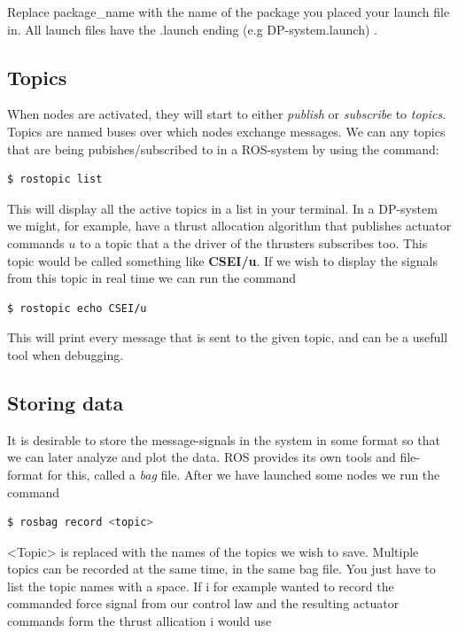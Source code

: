 \documentclass{ol-softwaremanual}
\begin{document}
Replace package\_name with the name of the package you placed your launch file in. All launch files have the .launch ending (e.g DP-system.launch) . 

\subsection{Topics}

When nodes are activated, they will start to either \textit{publish} or \textit{subscribe} to \textit{topics}. Topics are named buses over which nodes exchange messages. We can any topics that are being pubishes/subscribed to in a ROS-system by using the command: 

\begin{lstlisting}[language=bash,basicstyle=\mlttfamily, breaklines=true]
  $ rostopic list 
\end{lstlisting} 

This will display all the active topics in a list in your terminal. In a DP-system we might, for example, have a thrust allocation algorithm that publishes actuator commands $u$ to a topic that a the driver of the thrusters subscribes too. This topic would be called something like \textbf{CSEI/u}. If we wish to display the signals from this topic in real time we can run the command

\begin{lstlisting}[language=bash,basicstyle=\mlttfamily, breaklines=true]
  $ rostopic echo CSEI/u
\end{lstlisting}
This will print every message that is sent to the given topic, and can be a usefull tool when debugging.

\subsection{Storing data}

It is desirable to store the message-signals in the system in some format so that we can later analyze and plot the data. ROS provides its own tools and file-format for this, called a \textit{bag} file. After we have launched some nodes we run the command 
\begin{lstlisting}[language=bash,basicstyle=\mlttfamily, breaklines=true]
  $ rosbag record <topic>
\end{lstlisting}

<Topic> is replaced with the names of the topics we wish to save. Multiple topics can be recorded at the same time, in the same bag file. You just have to list the topic names with a space. If i for example wanted to record the commanded force signal from our control law and the resulting actuator commands form the thrust allication i would use 
\end{document}
